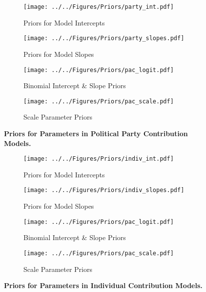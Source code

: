 \documentclass[12pt]{article}
\begin{document}
\begin{appendices}
\begin{figure*}[!htb]
    \centering
    \begin{subfigure}[b]{0.45\textwidth}
        \centering
        \texttt{[image: ../../Figures/Priors/party\_int.pdf]}
        \caption{Priors for Model Intercepts}
    \end{subfigure}
    \begin{subfigure}[b]{0.45\textwidth}
        \centering
        \texttt{[image: ../../Figures/Priors/party\_slopes.pdf]}
        \caption{Priors for Model Slopes}
    \end{subfigure}
    \begin{subfigure}[b]{0.45\textwidth}
    	\centering
        \texttt{[image: ../../Figures/Priors/pac\_logit.pdf]}
        \caption{Binomial Intercept \& Slope Priors}
    \end{subfigure}
    \begin{subfigure}[b]{0.45\textwidth}
    	\centering
        \texttt{[image: ../../Figures/Priors/pac\_scale.pdf]}
        \caption{Scale Parameter Priors}
    \end{subfigure}
    \caption{\textbf{Priors for Parameters in Political Party Contribution Models.}}
    \label{fig: priors}
\end{figure*}

\begin{figure*}[!htb]
    \centering
    \begin{subfigure}[b]{0.45\textwidth}
        \centering
        \texttt{[image: ../../Figures/Priors/indiv\_int.pdf]}
        \caption{Priors for Model Intercepts}
    \end{subfigure}
    \begin{subfigure}[b]{0.45\textwidth}
        \centering
        \texttt{[image: ../../Figures/Priors/indiv\_slopes.pdf]}
        \caption{Priors for Model Slopes}
    \end{subfigure}
    \begin{subfigure}[b]{0.45\textwidth}
    	\centering
        \texttt{[image: ../../Figures/Priors/pac\_logit.pdf]}
        \caption{Binomial Intercept \& Slope Priors}
    \end{subfigure}
    \begin{subfigure}[b]{0.45\textwidth}
    	\centering
        \texttt{[image: ../../Figures/Priors/pac\_scale.pdf]}
        \caption{Scale Parameter Priors}
    \end{subfigure}
    \caption{\textbf{Priors for Parameters in Individual Contribution Models.}}
    \label{fig: priors}
\end{figure*}


\end{appendices}
\end{document}

